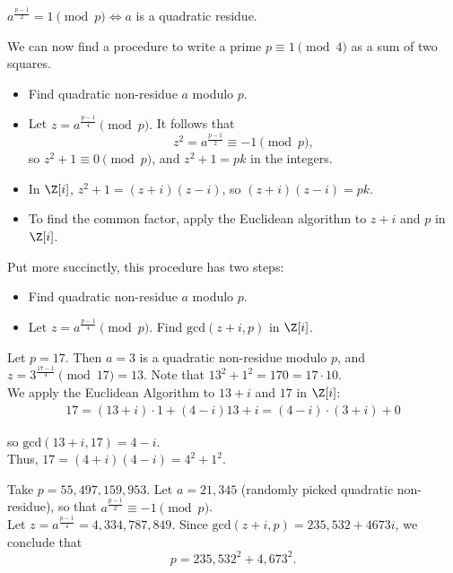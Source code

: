 \documentclass[11pt]{article}
\begin{document}
\begin{remark}
$a^{\frac{p-1}{2}} = 1 \pmod p \iff a$ is a quadratic residue.
\end{remark}

We can now find a procedure to write a prime $p \equiv 1 \pmod 4$ as a sum of two squares.
\begin{itemize}
    \item Find quadratic non-residue $a$ modulo $p$.
    \item Let $z = a^{\frac{p-1}{4}} \pmod p.$ It follows that 
    \[
        z^2 = a^{\frac{p-1}{2}} \equiv -1 \pmod p,
    \]
    so $z^2 + 1 \equiv 0 \pmod p$, and $z^2 + 1 = pk$ in the integers.
    \item In $\Z[i]$, $z^2 + 1 = (z+i)(z-i)$, so $(z+i)(z-i) = pk.$
    \item To find the common factor, apply the Euclidean algorithm to $z+i$ and $p$ in $\Z[i]$.
\end{itemize}

Put more succinctly, this procedure has two steps:
\begin{itemize}
    \item Find quadratic non-residue $a$ modulo $p$.
    \item Let $z = a^{\frac{p-1}{4}} \pmod p.$ Find $\mathrm{gcd}(z+i, p)$ in $\Z[i]$. 
\end{itemize} 

\begin{eg}
Let $p = 17$. Then $a = 3$ is a quadratic non-residue modulo $p$, and $z = 3^{\frac{17-1}{4}} \pmod{17} = 13.$ Note that $13^2 + 1^2 = 170 = 17 \cdot 10.$ \\

We apply the Euclidean Algorithm to $13+i$ and $17$ in $\Z[i]$:
\begin{align*}
    17 = (13+i) \cdot 1 + (4-i)
    13+i = (4-i) \cdot (3+i) + 0
\end{align*}

so $\mathrm{gcd}(13+i, 17) = 4-i$. \\

Thus, $17 = (4+i)(4-i) = \boxed{4^2 + 1^2}.$
\end{eg}

\begin{eg}
Take $p = 55, 497, 159, 953$. Let $a = 21, 345$ (randomly picked quadratic non-residue), so that $a^{\frac{p-1}{2}} \equiv -1 \pmod p$. \\

Let $z = a^{\frac{p-1}{4}} = 4,334,787,849.$ Since $\mathrm{gcd}(z+i, p) = 235,532 + 4673i$, we conclude that
\[
    p = 235,532^2 + 4,673^2.
\] 
\end{eg}
\end{document}

